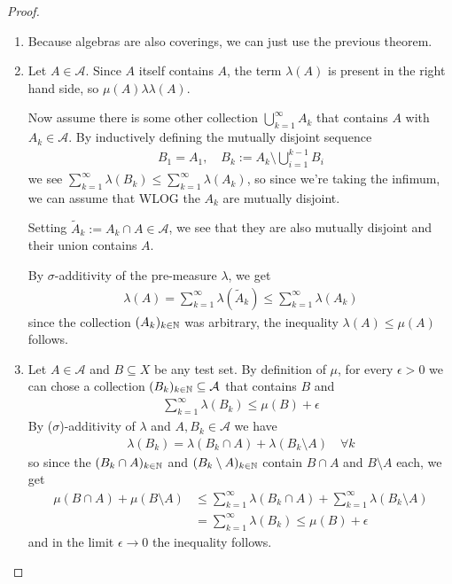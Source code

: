 \begin{proof}
\begin{enumerate}
  \item Because algebras are also coverings, we can just use the previous theorem.
  \item Let $A \in \mathcal{A}$. 
    Since $A$ itself contains $A$, the term $\lambda(A)$ is present in the right hand side, so $\mu(A) \lambda \lambda(A)$.

    Now assume there is some other collection $\bigcup_{k=1}^{\infty} A_k$ that contains $A$ with $A_k \in \mathcal{A}$.
    By inductively defining the mutually disjoint sequence
    \begin{align*}
      B_1 = A_1, \quad
      B_k := A_k \setminus \bigcup_{i=1}^{k-1}B_i
    \end{align*}
    we see $\sum_{k=1}^{\infty}\lambda(B_k) \leq \sum_{k=1}^{\infty}\lambda(A_k)$, 
    so since we're taking the infimum, we can assume that WLOG the $A_k$ are mutually disjoint.



    Setting $\tilde{A}_k := A_k \cap A \in \mathcal{A}$, we see that they are also mutually disjoint and their union contains $A$.

    By $\sigma$-additivity of the pre-measure $\lambda$, we get
    \begin{align*}
      \lambda(A) = \sum_{k=1}^{\infty} \lambda(\tilde{A}_k) \leq \sum_{k=1}^{\infty} \lambda(A_k)
    \end{align*}
    since the collection $(A_k)_{k \in \mathbb{N}}$ was arbitrary, the inequality $\lambda(A) \leq \mu(A)$ follows.


  \item Let $A \in \mathcal{A}$ and $B \subseteq X$ be any test set. 
    By definition of $\mu$, for every $\epsilon > 0$ we can chose a collection $(B_k)_{k \in \mathbb{N}} \subseteq \mathcal{A}$ that contains $B$ and
    \begin{align*}
      \sum_{k=1}^{\infty} \lambda(B_k) \leq \mu(B) + \epsilon
    \end{align*}
    By ($\sigma$)-additivity of $\lambda$ and $A, B_k \in \mathcal{A}$ we have
    \begin{align*}
      \lambda(B_k) = \lambda(B_k \cap A) + \lambda(B_k \setminus A) \quad \forall k
    \end{align*}
    so since the $(B_k \cap A)_{k \in \mathbb{N}}$ and $(B_k \setminus A)_{k \in \mathbb{N}}$ contain $B \cap A$ and $B \setminus A$ each, we get
    \begin{align*}
      \mu(B \cap A) + \mu(B \setminus A) 
      &\leq
      \sum_{k=1}^{\infty} \lambda(B_k \cap A) + \sum_{k=1}^{\infty} \lambda(B_k \setminus A)\\
      &= \sum_{k=1}^{\infty} \lambda(B_k) \leq \mu(B) + \epsilon
    \end{align*}
    and in the limit $\epsilon \to 0$ the inequality follows.
\end{enumerate}
\end{proof}

